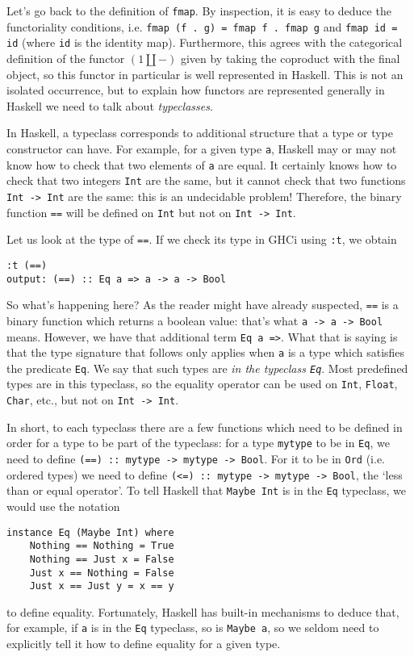 \documentclass[11pt]{article}
\theoremstyle{nonumberplain}
\newcommand{\blank}{{-}}
\newcommand*\lsin{\lstinline}
\begin{document}
Let's go back to the definition of \lsin|fmap|. By inspection, it is easy to deduce the functoriality conditions, i.e. \lsin|fmap (f . g) = fmap f . fmap g| and \lsin|fmap id = id| (where \lsin|id| is the identity map). Furthermore, this agrees with the categorical definition of the functor $(1 \amalg \blank)$ given by taking the coproduct with the final object, so this functor in particular is well represented in Haskell. This is not an isolated occurrence, but to explain how functors are represented generally in Haskell we need to talk about \emph{typeclasses}.

In Haskell, a typeclass corresponds to additional structure that a type or type constructor can have. For example, for a given type \lsin|a|, Haskell may or may not know how to check that two elements of \lsin|a| are equal. It certainly knows how to check that two integers \lsin|Int| are the same, but it cannot check that two functions \lsin|Int -> Int| are the same: this is an undecidable problem! Therefore, the binary function \lsin|==| will be defined on \lsin|Int| but not on \lsin|Int -> Int|.

Let us look at the type of \lsin|==|. If we check its type in GHCi using \lsin|:t|, we obtain
\begin{lstlisting}
:t (==)
output: (==) :: Eq a => a -> a -> Bool
\end{lstlisting}

So what's happening here? As the reader might have already suspected, \lsin|==| is a binary function which returns a boolean value: that's what \lsin|a -> a -> Bool| means. However, we have that additional term \lsin|Eq a =>|. What that is saying is that the type signature that follows only applies when \lsin|a| is a type which satisfies the predicate \lsin|Eq|. We say that such types are \emph{in the typeclass \lsin|Eq|}. Most predefined types are in this typeclass, so the equality operator can be used on \lsin|Int|, \lsin|Float|, \lsin|Char|, etc., but not on \lsin|Int -> Int|.

In short, to each typeclass there are a few functions which need to be defined in order for a type to be part of the typeclass: for a type \lsin|mytype| to be in \lsin|Eq|, we need to define \lsin|(==) :: mytype -> mytype -> Bool|. For it to be in \lsin|Ord| (i.e. ordered types) we need to define \lsin|(<=) :: mytype -> mytype -> Bool|, the `less than or equal operator'. To tell Haskell that \lsin|Maybe Int| is in the \lsin|Eq| typeclass, we would use the notation
\begin{lstlisting}
instance Eq (Maybe Int) where
    Nothing == Nothing = True
    Nothing == Just x = False
    Just x == Nothing = False
    Just x == Just y = x == y
\end{lstlisting}
to define equality. Fortunately, Haskell has built-in mechanisms to deduce that, for example, if \lsin|a| is in the \lsin|Eq| typeclass, so is \lsin|Maybe a|, so we seldom need to explicitly tell it how to define equality for a given type.
\end{document}
